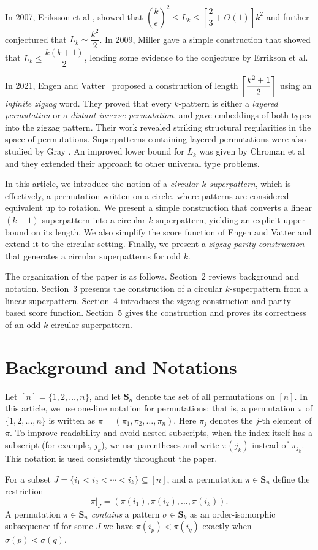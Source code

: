 \documentclass[a4paper,12pt]{article}
\theoremstyle{definition}
\numberwithin{equation}{section}
\DeclarePairedDelimiter{\ceil}{\lceil}{\rceil}
\begin{document}
In 2007, Eriksson et al \cite{eriksson2007dense}, showed that $\left(\dfrac{k}{e}\right)^2\le L_k\leq \left[\dfrac{2}{3}+O(1)\right]k^2$ and further conjectured that $L_k\sim \dfrac{k^2}{2}$. In 2009, Miller \cite{miller2009asymptotic} gave a simple construction that showed that $L_k\leq \dfrac{k(k+1)}{2}$, lending some evidence to the conjecture by Errikson et al.

In 2021, Engen and Vatter~\cite{engen2020containing} proposed a construction of length $\ceil*{\dfrac{k^2+1}{2}}$ using an  \emph{infinite zigzag} word. They proved that every $k$-pattern is either a \emph{layered permutation} or a \emph{distant inverse permutation}, and gave embeddings of both types into the zigzag pattern.  Their work revealed striking structural regularities in the space of permutations. Superpatterns containing layered permutations  were also studied by Gray \cite{gray2015bounds}. An improved lower bound for $L_k$ was given by Chroman et al \cite{chroman2021lower} and they extended their approach to other universal type problems.

In this article, we introduce the notion of a \emph{circular $k$-superpattern}, which is effectively, a permutation written on a circle, where patterns are considered equivalent up to rotation.  We present a simple construction that converts a linear $(k-1)$-superpattern into a circular $k$-superpattern, yielding an explicit upper bound on its length.  We also simplify the score function of Engen and Vatter and extend it to the circular setting.  Finally, we present a \emph{zigzag parity construction} that generates a circular superpatterns for odd $k$.

The organization of the paper is as follows. Section~2 reviews background and notation. Section~3 presents the construction of a circular $k$-superpattern from a linear superpattern. Section~4 introduces the zigzag construction and parity-based score function. Section~5 gives the construction and proves its correctness of an odd $k$ circular superpattern.


\section{Background and Notations}

Let $[n] = \{1,2,\dots,n\}$, and let $\mathbf{S}_n$ denote the set of all permutations on $[n]$. In this article, we use  one-line notation for permutations; that is, a permutation $\pi$ of $\{1,2,\dots,n\}$ is written as 
$\pi = (\pi_1, \pi_2, \dots, \pi_n)$.  
Here $\pi_j$ denotes the $j$-th element of $\pi$. To improve readability and avoid nested subscripts, when the index itself has a subscript (for example, $j_k$), 
we use parentheses and write $\pi(j_k)$ instead of $\pi_{j_k}$. 
This notation is used consistently throughout the paper. \par
For a subset $J = \{i_1 < i_2 < \cdots < i_k\} \subseteq [n]$, and a permutation $\pi \in \mathbf{S}_n$ define the restriction
\[
\pi|_J = (\pi(i_1), \pi(i_2), \dots, \pi(i_k)).
\]
A permutation $\pi \in \mathbf{S}_n$ \emph{contains} a pattern $\sigma \in \mathbf{S}_k$ as an order-isomorphic subsequence if for some $J$ we have $\pi(i_p) < \pi(i_q)$ exactly when $\sigma(p) < \sigma(q)$.
\end{document}
